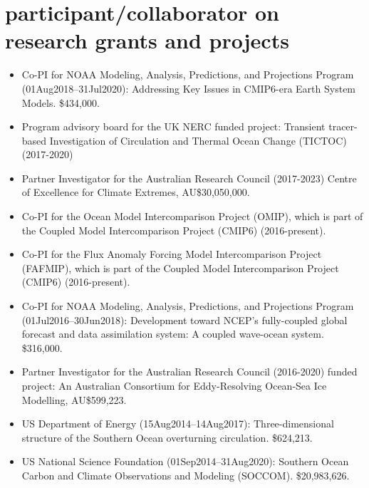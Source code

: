 \documentclass{article}
\begin{document}
\section*{\sc \color{Maroon}  participant/collaborator on research grants and projects}
\vspace{-.3cm}

\begin{itemize}[leftmargin=*]

\item Co-PI for NOAA Modeling, Analysis, Predictions, and Projections Program (01Aug2018--31Jul2020): Addressing Key Issues in CMIP6-era Earth System Models. \$434,000.
    
\item Program advisory board for the UK NERC funded project: Transient tracer-based Investigation of Circulation and Thermal Ocean Change (TICTOC) (2017-2020)

\item Partner Investigator for the Australian Research Council (2017-2023) Centre of Excellence for Climate Extremes, AU\$30,050,000.
  
\item Co-PI for the Ocean Model Intercomparison Project (OMIP), which is part of the Coupled Model Intercomparison Project (CMIP6) (2016-present).    

\item Co-PI for the Flux Anomaly Forcing Model Intercomparison Project (FAFMIP), which is part of the Coupled Model Intercomparison Project (CMIP6) (2016-present).    

\item Co-PI for NOAA Modeling, Analysis, Predictions, and Projections Program (01Jul2016--30Jun2018): Development toward NCEP's fully-coupled global forecast and data assimilation system: A coupled wave-ocean
  system.  \$316,000.

\item Partner Investigator for the  Australian Research Council (2016-2020) funded project: An Australian Consortium for Eddy-Resolving Ocean-Sea Ice Modelling, AU\$599,223.

\item US Department of Energy (15Aug2014--14Aug2017): Three-dimensional structure of the Southern Ocean overturning
circulation.  \$624,213.

\item US National Science Foundation (01Sep2014--31Aug2020): Southern Ocean Carbon and Climate Observations and Modeling
  (SOCCOM). \$20,983,626.


\end{itemize}
\end{document}
